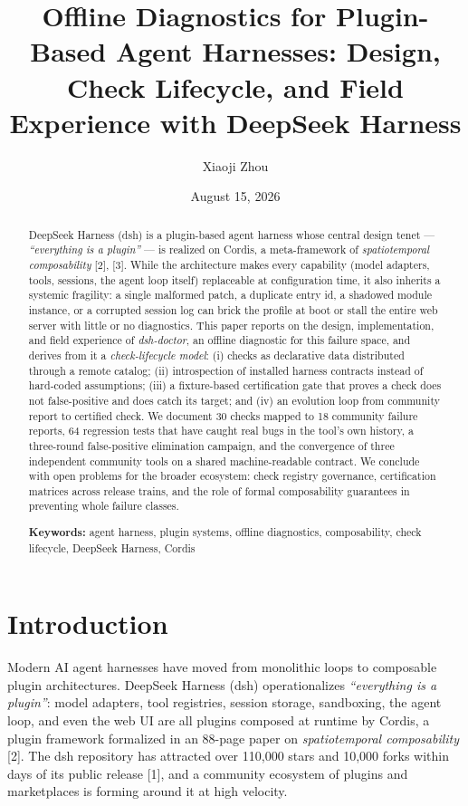 \documentclass[11pt]{article}
\title{Offline Diagnostics for Plugin-Based Agent Harnesses: Design, Check
Lifecycle, and Field Experience with DeepSeek Harness}
\author{Xiaoji Zhou}
\date{August 15, 2026}
\begin{document}
\maketitle

\begin{abstract}
DeepSeek Harness (dsh) is a plugin-based agent harness whose central
design tenet --- \emph{``everything is a plugin''} --- is realized on
Cordis, a meta-framework of \emph{spatiotemporal composability} [2],
[3]. While the architecture makes every capability (model adapters,
tools, sessions, the agent loop itself) replaceable at configuration
time, it also inherits a systemic fragility: a single malformed patch, a
duplicate entry id, a shadowed module instance, or a corrupted session
log can brick the profile at boot or stall the entire web server with
little or no diagnostics. This paper reports on the design,
implementation, and field experience of \emph{dsh-doctor}, an offline
diagnostic for this failure space, and derives from it a
\emph{check-lifecycle model}: (i) checks as declarative data distributed
through a remote catalog; (ii) introspection of installed harness
contracts instead of hard-coded assumptions; (iii) a fixture-based
certification gate that proves a check does not false-positive and does
catch its target; and (iv) an evolution loop from community report to
certified check. We document 30 checks mapped to 18 community failure
reports, 64 regression tests that have caught real bugs in the tool's
own history, a three-round false-positive elimination campaign, and the
convergence of three independent community tools on a shared
machine-readable contract. We conclude with open problems for the
broader ecosystem: check registry governance, certification matrices
across release trains, and the role of formal composability guarantees
in preventing whole failure classes.

\textbf{Keywords:} agent harness, plugin systems, offline diagnostics,
composability, check lifecycle, DeepSeek Harness, Cordis
\end{abstract}

\section{Introduction}\label{introduction}

Modern AI agent harnesses have moved from monolithic loops to composable
plugin architectures. DeepSeek Harness (dsh) operationalizes
\emph{``everything is a plugin''}: model adapters, tool registries,
session storage, sandboxing, the agent loop, and even the web UI are all
plugins composed at runtime by Cordis, a plugin framework formalized in
an 88-page paper on \emph{spatiotemporal composability} [2]. The dsh
repository has attracted over 110,000 stars and 10,000 forks within days
of its public release [1], and a community ecosystem of plugins and
marketplaces is forming around it at high velocity.
\end{document}
